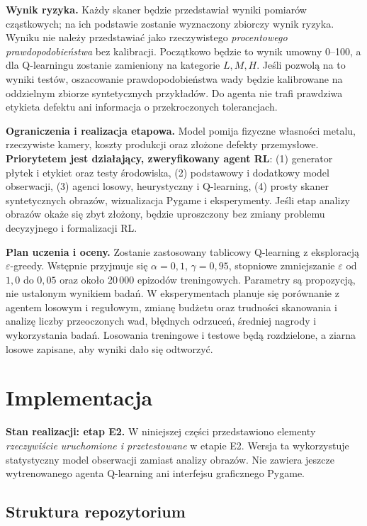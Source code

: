 \documentclass[12pt]{article}
\begin{document}
\textbf{Wynik ryzyka.} Każdy skaner będzie przedstawiał wyniki pomiarów cząstkowych; na ich podstawie zostanie wyznaczony zbiorczy wynik ryzyka. Wyniku nie należy przedstawiać jako rzeczywistego \emph{procentowego prawdopodobieństwa} bez kalibracji. Początkowo będzie to wynik umowny 0--100, a dla Q-learningu zostanie zamieniony na kategorie \(L,M,H\). Jeśli pozwolą na to wyniki testów, oszacowanie prawdopodobieństwa wady będzie kalibrowane na oddzielnym zbiorze syntetycznych przykładów. Do agenta nie trafi prawdziwa etykieta defektu ani informacja o przekroczonych tolerancjach.

\textbf{Ograniczenia i realizacja etapowa.} Model pomija fizyczne własności metalu, rzeczywiste kamery, koszty produkcji oraz złożone defekty przemysłowe. \textbf{Priorytetem jest działający, zweryfikowany agent RL}: (1) generator płytek i etykiet oraz testy środowiska, (2) podstawowy i dodatkowy model obserwacji, (3) agenci losowy, heurystyczny i Q-learning, (4) prosty skaner syntetycznych obrazów, wizualizacja Pygame i eksperymenty. Jeśli etap analizy obrazów okaże się zbyt złożony, będzie uproszczony bez zmiany problemu decyzyjnego i formalizacji RL.

\textbf{Plan uczenia i oceny.} Zostanie zastosowany tablicowy Q-learning z eksploracją \(\varepsilon\)-greedy. Wstępnie przyjmuje się \(\alpha=0{,}1\), \(\gamma=0{,}95\), stopniowe zmniejszanie \(\varepsilon\) od \(1{,}0\) do \(0{,}05\) oraz około 20\,000 epizodów treningowych. Parametry są propozycją, nie ustalonym wynikiem badań. W eksperymentach planuje się porównanie z agentem losowym i regułowym, zmianę budżetu oraz trudności skanowania i analizę liczby przeoczonych wad, błędnych odrzuceń, średniej nagrody i wykorzystania badań. Losowania treningowe i testowe będą rozdzielone, a ziarna losowe zapisane, aby wyniki dało się odtworzyć.


\section{Implementacja}

\noindent\textbf{Stan realizacji: etap E2.}
W niniejszej części przedstawiono elementy \emph{rzeczywiście uruchomione i przetestowane} w etapie E2. Wersja ta wykorzystuje statystyczny model obserwacji zamiast analizy obrazów. Nie zawiera jeszcze wytrenowanego agenta Q-learning ani interfejsu graficznego Pygame.

\subsection{Struktura repozytorium}
\end{document}
